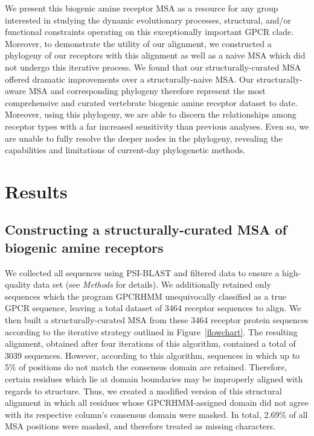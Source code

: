 \documentclass[fleqn,10pt]{wlpeerj}
\begin{document}
We present this biogenic amine receptor MSA as a resource for any group interested in studying the dynamic evolutionary processes, structural, and/or functional constraints operating on this exceptionally important GPCR clade. Moreover, to demonstrate the utility of our alignment, we constructed a phylogeny of our receptors with this alignment as well as a naive MSA which did not undergo this iterative process. We found that our structurally-curated MSA offered dramatic improvements over a structurally-naive MSA. Our structurally-aware MSA and corresponding phylogeny therefore represent the most comprehensive and curated vertebrate biogenic amine receptor dataset to date. Moreover, using this phylogeny, we are able to discern the relationships among receptor types with a far increased sensitivity than previous analyses. Even so, we are unable to fully resolve the deeper nodes in the phylogeny, revealing the capabilities and limitations of current-day phylogenetic methods.

\section*{Results}

\subsection*{Constructing a structurally-curated MSA of biogenic amine receptors}
We collected all sequences using PSI-BLAST and filtered data to ensure a high-quality data set (see \emph{Methods} for details). We additionally retained only sequences which the program GPCRHMM unequivocally classified as a true GPCR sequence, leaving a total dataset of 3464 receptor sequences to align. We then built a structurally-curated MSA from these 3464 receptor protein sequences according to the iterative strategy outlined in Figure~\ref{flowchart}. The resulting alignment, obtained after four iterations of this algorithm, contained a total of 3039 sequences. However, according to this algorithm, sequences in which up to 5\% of positions do not match the consensus domain are retained. Therefore, certain residues which lie at domain boundaries may be improperly aligned with regards to structure. Thus, we created a modified version of this structural alignment in which all residues whose GPCRHMM-assigned domain did not agree with its respective column's consensus domain were masked. In total, 2.69\% of all MSA positions were masked, and therefore treated as missing characters.
\end{document}
